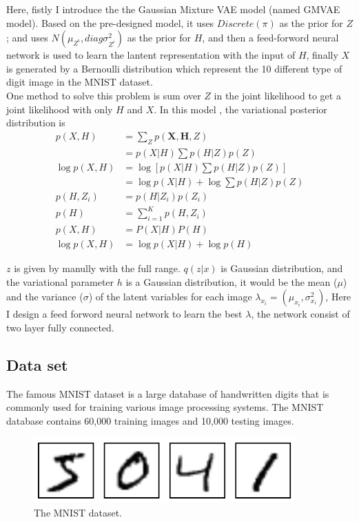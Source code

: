 \documentclass[a4paper]{article}
\begin{document}
Here, fistly I introduce the the Gaussian Mixture VAE model (named GMVAE model). 
Based on the pre-designed model,  it uses $Discrete(\pi)$ as the prior for $Z$; and uses 
$N(\mu_{Z^{i}}, diag{\sigma_{Z^{i}}^{2}})$ as the prior for $H$, and then a feed-forword
neural network is used to learn the lantent representation with the input of $H$, finally 
$X$ is generated by a Bernoulli distribution which represent the 10 different type of digit 
image in the MNIST dataset.
\\
One method to solve this problem is  sum over $Z$ in the joint likelihood to get a joint likelihood
with only $H$ and $X$. In this model , the variational posterior distribution is 
\begin{equation}
    \begin{aligned}
        p(X,H)&= \sum_Z p(\textbf{X},\textbf{H},Z) \\
              &= p(X|H) \sum p(H|Z)p(Z) \\
        \log p(X,H) &= \log [p(X|H) \sum p(H|Z)p(Z)] \\
                    &= \log p(X|H) + \log \sum p(H|Z)p(Z) \\ 
        p(H, Z_i) &= p(H|Z_i)p(Z_i) \\
        p(H) &= \sum_{i=1}^K p(H,Z_i) \\
        p(X,H)  &= P(X|H)P(H) \\
        \log p(X,H) &= \log p(X|H) + \log p(H)
    \end{aligned}
\end{equation} 

$z$ is given by manully with the full range.
 $q(z|x)$ is Gaussian distribution, and the variational parameter $h$ is a Gaussian distribution, it would be the mean ($\mu$) and the variance ($\sigma$) of the latent variables for each image $\lambda_{x_i} = (\mu_{x_i}, \sigma^2_{x_i})$, 
Here I design a feed forword neural network to learn the best $\lambda$, the network consist of two layer fully connected.

\subsection{Data set}
The famous MNIST dataset is a large database of handwritten digits that is commonly used for training various image processing systems. The MNIST database contains 60,000 training images and 10,000 testing images.

\begin{figure}[!htbp]
\begin{center}
\includegraphics[width=10cm]{imgs/MNIST.png}
\end{center}
\caption{The MNIST dataset.}\label{datavis}
\end{figure}
\end{document}
